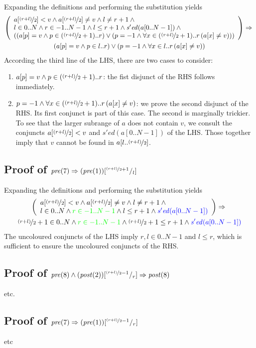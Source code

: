 \documentclass[headings=small,a4paper,12pt]{scrartcl}
\newcommand{\sorted}[3]{\mathit{s'ed}(#1[#2..#3])}
\newcommand{\pre}{\mathit{pre}}
\newcommand{\post}{\mathit{post}}
\begin{document}
Expanding the definitions and performing the substitution yields
\begin{gather*}
  \left(
    \begin{array}{l}
      a[\nicefrac{(r+l)}2]<v\And a[\nicefrac{(r+l)}2]\neq v \And l\neq r+1\And{}\\
      l\in 0..N\And r\in -1..N-1\And l\leq r+1 \And \sorted a0{N-1}\And{}\\
      ((a[p]=v\And p\in (\nicefrac{(r+l)}2+1)..r)\Or (p=-1\And\All{x\in (\nicefrac{(r+l)}2+1)..r}{a[x]\neq v}))
    \end{array}
  \right)
  \Implies{}\\
  (a[p]=v\And p\in l..r)\Or (p=-1\And\All{x\in l..r}{a[x]\neq v})
\end{gather*}
According the third line of the LHS, there are two cases to consider:
\begin{enumerate}
\item $a[p]=v\wedge p\in (\nicefrac{(r+l)}2+1)..r$: the fist disjunct
  of the RHS follows immediately.
\item $p=-1\wedge\forall x\in (\nicefrac{(r+l)}2+1)..r\left(a[x]\neq v\right)$: we
  prove the second disjunct of the RHS. Its first conjunct is part of
  this case. The second is marginally trickier. To see that the larger
  subrange of $a$ does not contain $v$, we consult the conjuncts
  $a[\nicefrac{(r+l)}2]<v$ and $\sorted a0{N-1}$ of the LHS. Those
  together imply that $v$ cannot be found in
  $a[l..\nicefrac{(r+l)}2]$.
\end{enumerate}

\subsection{Proof of $\pre(7)\Implies (\pre(1))\subst{\nicefrac{(r+l)}2+1}l$}
\label{sec:proof7pre}

Expanding the definitions and performing the substitution yields
\begin{gather*}
  \left(
    \begin{array}{l}
      a[\nicefrac{(r+l)}2]<v\And a[\nicefrac{(r+l)}2]\neq v \And l\neq r+1\And{}\\
      l\in 0..N\And {\color{green}r\in -1..N-1}\And l\leq r+1 \And {\color{blue}\sorted a0{N-1}}
    \end{array}
  \right)
  \Implies{}\\
  \nicefrac{(r+l)}2+1\in 0..N\And {\color{green}r\in -1..N-1}\And \nicefrac{(r+l)}2+1\leq r+1 \And {\color{blue}\sorted a0{N-1}}
\end{gather*}
The uncoloured conjuncts of the LHS imply $r,l\in 0..N-1$ and
$l\leq r$, which is sufficient to ensure the uncoloured conjuncts of
the RHS.

\subsection{Proof of $\pre(8)\And (\post(2))\subst{\nicefrac{(r+l)}2-1}r\Implies \post(8)$}
\label{sec:proof8post}

etc.
\subsection{Proof of $\pre(7)\Implies (\pre(1))\subst{\nicefrac{(r+l)}2-1}r$}
\label{sec:proof8pre}

etc
\end{document}
